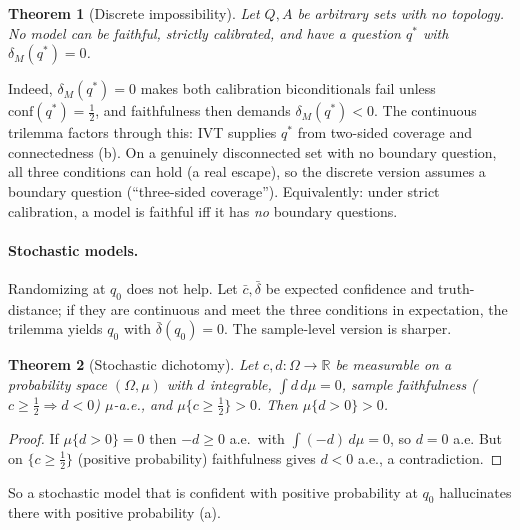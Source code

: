 \documentclass[10pt]{article}
\newtheorem{theorem}{Theorem}[section]
\newcommand{\R}{\mathbb{R}}
\newcommand{\conf}{\mathrm{conf}}
\begin{document}
\begin{theorem}[Discrete impossibility]\label{thm:pure-discrete}
Let $Q,A$ be arbitrary sets with no topology. No model can be faithful,
strictly calibrated, and have a question $q^*$ with $\delta_M(q^*)=0$.
\end{theorem}

Indeed, $\delta_M(q^*)=0$ makes both calibration biconditionals fail unless
$\conf(q^*)=\tfrac12$, and faithfulness then demands $\delta_M(q^*)<0$. The
continuous trilemma factors through this: IVT supplies $q^*$ from two-sided
coverage and connectedness (b). On a genuinely
disconnected set with no boundary question, all three conditions can hold (a
real escape), so the discrete version assumes a boundary question
(``three-sided coverage''). Equivalently: under strict calibration, a model is
faithful iff it has \emph{no} boundary questions.

\paragraph{Stochastic models.}
Randomizing at $q_0$ does not help. Let $\bar c,\bar\delta$ be expected
confidence and truth-distance; if they are continuous and meet the three
conditions in expectation, the trilemma yields $q_0$ with $\bar\delta(q_0)=0$.
The sample-level version is sharper.

\begin{theorem}[Stochastic dichotomy]\label{thm:dichotomy}
Let $c,d\colon\Omega\to\R$ be measurable on a probability space $(\Omega,\mu)$
with $d$ integrable, $\int d\,d\mu=0$, sample faithfulness
($c\ge\tfrac12\Rightarrow d<0$) $\mu$-a.e., and $\mu\{c\ge\tfrac12\}>0$. Then
$\mu\{d>0\}>0$.
\end{theorem}
\begin{proof}
If $\mu\{d>0\}=0$ then $-d\ge0$ a.e.\ with $\int(-d)\,d\mu=0$, so $d=0$ a.e.
But on $\{c\ge\tfrac12\}$ (positive probability) faithfulness gives $d<0$
a.e., a contradiction.
\end{proof}

So a stochastic model that is confident with positive probability at $q_0$
hallucinates there with positive probability (a).
\end{document}
